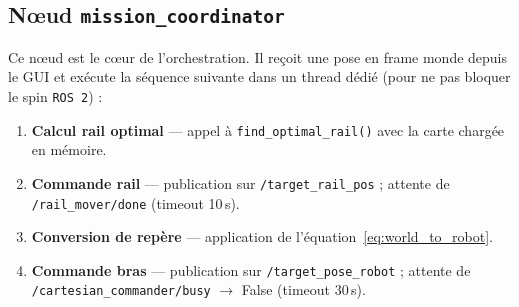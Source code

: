 \documentclass[11pt, a4paper]{article}
\newcommand{\ros}{\texttt{ROS\,2}}
\newcommand{\topic}[1]{\texttt{\color{AccentOrange}#1}}
\begin{document}
\begin{center}
\end{center}

\subsection{Nœud \texttt{mission\_coordinator}}

Ce nœud est le cœur de l'orchestration. Il reçoit une pose en frame monde depuis le GUI et exécute la séquence suivante dans un thread dédié (pour ne pas bloquer le spin \ros) :

\begin{enumerate}[leftmargin=2em, itemsep=4pt]
  \item \textbf{Calcul rail optimal} — appel à \texttt{find\_optimal\_rail()} avec la carte chargée en mémoire.
  \item \textbf{Commande rail} — publication sur \topic{/target\_rail\_pos} ; attente de \topic{/rail\_mover/done} (timeout 10\,s).
  \item \textbf{Conversion de repère} — application de l'équation~\eqref{eq:world_to_robot}.
  \item \textbf{Commande bras} — publication sur \topic{/target\_pose\_robot} ; attente de \topic{/cartesian\_commander/busy} $\to$ False (timeout 30\,s).
\end{enumerate}
\end{document}
